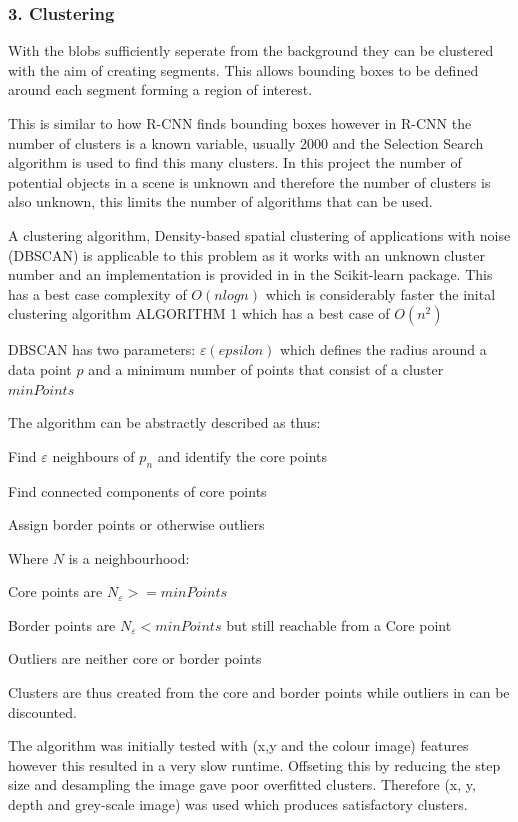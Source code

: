 \documentclass{mproj}
\begin{document}
\subsubsection{3. Clustering}

With the blobs sufficiently seperate from the background they can be clustered with the aim of creating segments. This allows bounding boxes to be defined around each segment forming a region of interest. 

This is similar to how R-CNN finds bounding boxes however in R-CNN the number of clusters is a known variable, usually 2000 and the Selection Search algorithm is used to find this many clusters. In this project the number of potential objects in a scene is unknown and therefore the number of clusters is also unknown, this limits the number of algorithms that can be used.

A clustering algorithm, Density-based spatial clustering of applications with noise (DBSCAN)\cite{} is applicable to this problem as it works with an unknown cluster number and an implementation is provided in in the Scikit-learn package. This has a best case complexity of $O(n log n)$ which is considerably faster the inital clustering algorithm ALGORITHM 1 which has a best case of $O(n^{2})$


DBSCAN has two parameters: $\varepsilon (epsilon)$ which defines the radius around a data point $p$ and a minimum number of points that consist of a cluster $minPoints$

The algorithm can be abstractly described as thus:

    Find $\varepsilon$ neighbours of $p_{n}$ and identify the core points
    
    Find connected components of core points
    
    Assign border points or otherwise outliers
  
Where $N$ is a neighbourhood:
 
Core points are  $N_{\varepsilon} >= minPoints $

Border points are $N_{\varepsilon} < minPoints $ but still reachable from a Core point

Outliers are neither core or border points


Clusters are thus created from the core and border points while outliers in can be discounted.

The algorithm was initially tested with (x,y and the colour image) features however this resulted in a very slow runtime. Offseting this by reducing the step size and desampling the image gave poor overfitted clusters. Therefore (x, y, depth and grey-scale image) was used which produces satisfactory clusters.
\end{document}
